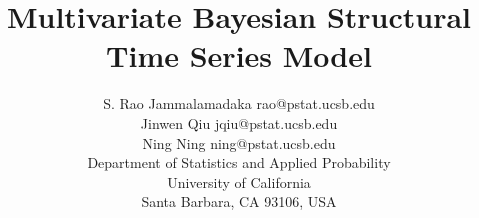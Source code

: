 \documentclass[twoside,11pt]{article}
\begin{document}
\title{Multivariate Bayesian Structural Time Series Model}

\author{\name S. Rao Jammalamadaka \email rao@pstat.ucsb.edu \\
       \name Jinwen Qiu \email jqiu@pstat.ucsb.edu \\
       \name Ning Ning \email ning@pstat.ucsb.edu \\
       \addr Department of Statistics and Applied Probability\\
       University of California\\
       Santa Barbara, CA 93106, USA}
   
\maketitle
\end{document}
